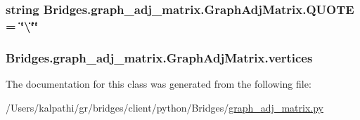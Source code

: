 \subsubsection[{Q\+U\+O\+T\+E}]{\setlength{\rightskip}{0pt plus 5cm}string Bridges.\+graph\+\_\+adj\+\_\+matrix.\+Graph\+Adj\+Matrix.\+Q\+U\+O\+T\+E = \char`\"{}\textbackslash{}\char`\"{}\char`\"{}\hspace{0.3cm}{\ttfamily [static]}}\label{class_bridges_1_1graph__adj__matrix_1_1_graph_adj_matrix_ae13e293f91e5b5b3b8f7143367fea2d5}
\hypertarget{class_bridges_1_1graph__adj__matrix_1_1_graph_adj_matrix_a6b739164cfcebbb2c953f01b75574486}{}
\subsubsection[{vertices}]{\setlength{\rightskip}{0pt plus 5cm}Bridges.\+graph\+\_\+adj\+\_\+matrix.\+Graph\+Adj\+Matrix.\+vertices}\label{class_bridges_1_1graph__adj__matrix_1_1_graph_adj_matrix_a6b739164cfcebbb2c953f01b75574486}


The documentation for this class was generated from the following file\+:\begin{DoxyCompactItemize}
\item 
/\+Users/kalpathi/gr/bridges/client/python/\+Bridges/\hyperlink{graph__adj__matrix_8py}{graph\+\_\+adj\+\_\+matrix.\+py}\end{DoxyCompactItemize}
